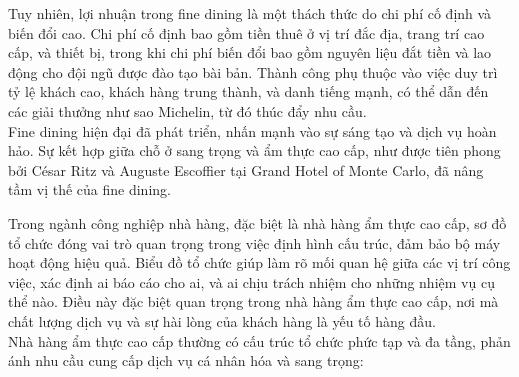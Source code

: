 Tuy nhiên, lợi nhuận trong fine dining là một thách thức do chi phí cố định và biến đổi cao. Chi phí cố định bao gồm tiền thuê ở vị trí đắc địa, trang trí cao cấp, và thiết bị, trong khi chi phí biến đổi bao gồm nguyên liệu đắt tiền và lao động cho đội ngũ được đào tạo bài bản. Thành công phụ thuộc vào việc duy trì tỷ lệ khách cao, khách hàng trung thành, và danh tiếng mạnh, có thể dẫn đến các giải thưởng như sao Michelin, từ đó thúc đẩy nhu cầu. \\

Fine dining hiện đại đã phát triển, nhấn mạnh vào sự sáng tạo và dịch vụ hoàn hảo. Sự kết hợp giữa chỗ ở sang trọng và ẩm thực cao cấp, như được tiên phong bởi César Ritz và Auguste Escoffier tại Grand Hotel of Monte Carlo, đã nâng tầm vị thế của fine dining.


Trong ngành công nghiệp nhà hàng, đặc biệt là nhà hàng ẩm thực cao cấp, sơ đồ tổ chức đóng vai trò quan trọng trong việc định hình cấu trúc, đảm bảo bộ máy hoạt động hiệu quả. Biểu đồ tổ chức giúp làm rõ mối quan hệ giữa các vị trí công việc, xác định ai báo cáo cho ai, và ai chịu trách nhiệm cho những nhiệm vụ cụ thể nào. Điều này đặc biệt quan trọng trong nhà hàng ẩm thực cao cấp, nơi mà chất lượng dịch vụ và sự hài lòng của khách hàng là yếu tố hàng đầu. \\
Nhà hàng ẩm thực cao cấp thường có cấu trúc tổ chức phức tạp và đa tầng, phản ánh nhu cầu cung cấp dịch vụ cá nhân hóa và sang trọng:


